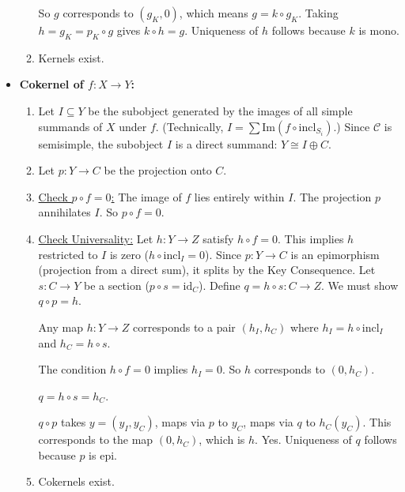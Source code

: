 \documentclass[11pt]{article}
\theoremstyle{definition}
\begin{document}
\begin{itemize}
\begin{enumerate}
        So \(g\) corresponds to \((g_K, 0)\), which means \(g = k \circ g_K\). Taking \(h = g_K = p_K \circ g\) gives \(k \circ h = g\). Uniqueness of \(h\) follows because \(k\) is mono.
      \item Kernels exist.
    \end{enumerate}
  \item \textbf{Cokernel of \(f: X \to Y\):}
    \begin{enumerate}
      \item Let \(I \subseteq Y\) be the subobject generated by the images of all simple summands of \(X\) under \(f\). (Technically, \(I = \sum \mathrm{Im}(f \circ \mathrm{incl}_{S_i})\).) Since \(\mathcal{C}\) is semisimple, the subobject \(I\) is a direct summand: \(Y \cong I \oplus C\).
      \item Let \(p: Y \to C\) be the projection onto \(C\).
      \item \underline{Check \(p \circ f = 0\):} The image of \(f\) lies entirely within \(I\). The projection \(p\) annihilates \(I\). So \(p \circ f = 0\).
      \item \underline{Check Universality:} Let \(h: Y \to Z\) satisfy \(h \circ f = 0\). This implies \(h\) restricted to \(I\) is zero (\(h \circ \mathrm{incl}_I = 0\)). Since \(p: Y \to C\) is an epimorphism (projection from a direct sum), it splits by the Key Consequence. Let \(s: C \to Y\) be a section (\(p \circ s = \mathrm{id}_C\)). Define \(q = h \circ s : C \to Z\). We must show \(q \circ p = h\).

        Any map \(h: Y \to Z\) corresponds to a pair \((h_I, h_C)\) where \(h_I = h \circ \mathrm{incl}_I\) and \(h_C = h \circ s\).

        The condition \(h \circ f = 0\) implies \(h_I = 0\). So \(h\) corresponds to \((0, h_C)\).

        \(q = h \circ s = h_C\).

        \(q \circ p\) takes \(y = (y_I, y_C)\), maps via \(p\) to \(y_C\), maps via \(q\) to \(h_C(y_C)\). This corresponds to the map \((0, h_C)\), which is \(h\). Yes. Uniqueness of \(q\) follows because \(p\) is epi.
      \item Cokernels exist.
          \end{enumerate}
          \end{itemize}
\end{document}
